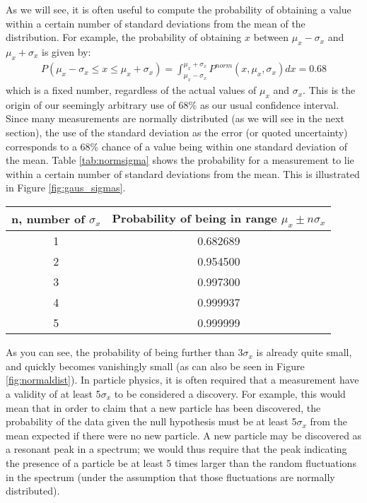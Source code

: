 As we will see, it is often useful to compute the probability of obtaining a value within a certain number of standard deviations from the mean of the distribution. For example, the probability of obtaining $x$ between $\mu_x-\sigma_x$ and $\mu_x+\sigma_x$ is given by:
 \begin{align}
P(\mu_x-\sigma_x \leq x \leq \mu_x+\sigma_x) = \int_{\mu_x-\sigma_x}^{\mu_x+\sigma_x}P^{norm}(x,\mu_x,\sigma_x)dx=0.68
\end{align}
which is a fixed number, regardless of the actual values of $\mu_x$ and $\sigma_x$. This is the origin of our seemingly arbitrary use of 68\% as our usual confidence interval. Since many measurements are normally distributed (as we will see in the next section), the use of the standard deviation as the error (or quoted uncertainty) corresponds to a 68\% chance of a value being within one standard deviation of the mean. Table \ref{tab:normsigma} shows the probability for a measurement to lie within a certain number of standard deviations from the mean. This is illustrated in Figure \ref{fig:gaus_sigmas}.
\begin{center}
\begin{tabular}{|c|c|}
\hline
\textbf{n, number of $\sigma_x$} & \textbf{Probability of being in range $\mu_x\pm n\sigma_x$}\\
\hline
1 & 0.682689\\
\hline
2 & 0.954500\\
\hline
3 & 0.997300\\
\hline
4 & 0.999937\\
\hline
5 & 0.999999\\
\hline
\end{tabular}
\end{center}


As you can see, the probability of being further than 3$\sigma_x$ is already quite small, and quickly becomes vanishingly small (as can also be seen in Figure \ref{fig:normaldist}). In particle physics, it is often required that a measurement have a validity of at least 5$\sigma_x$ to be considered a discovery. For example, this would mean that in order to claim that a new particle has been discovered, the probability of the data given the null hypothesis must be at least 5$\sigma_x$ from the mean expected if there were no new particle. A new particle may be discovered as a resonant peak in a spectrum; we would thus require that the peak indicating the presence of a particle be at least 5 times larger than the random fluctuations in the spectrum (under the assumption that those fluctuations are normally distributed).

